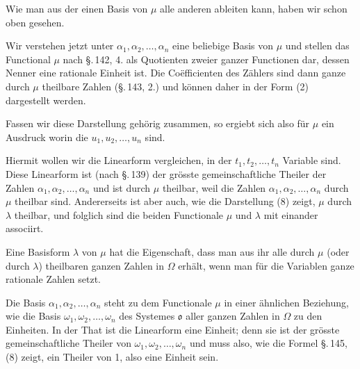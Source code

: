 
Wie man aus der einen Basis von $\mu$ alle anderen ableiten kann, haben
wir schon oben gesehen.

Wir verstehen jetzt unter $\alpha_1, \alpha_2, \ldots, \alpha_n$ eine
beliebige Basis von $\mu$ und stellen das Functional $\mu$ nach
\S.\,142, 4. als Quotienten zweier ganzer Functionen dar, dessen Nenner
eine rationale Einheit ist. Die Co\"efficienten des Zählers sind dann
ganze durch $\mu$ theilbare Zahlen (\S.\,143, 2.) und können daher in
der Form (2) dargestellt werden.

Fassen wir diese Darstellung gehörig zusammen, so ergiebt sich also für
$\mu$ ein Ausdruck
worin die $u_1, u_2, \ldots, u_n$ 
sind.

Hiermit wollen wir die Linearform
vergleichen, in der $t_1, t_2, \ldots, t_n$ Variable sind. Diese
Linearform ist (nach \S.\,139) der grösste gemeinschaftliche Theiler der
Zahlen $\alpha_1, \alpha_2, \ldots, \alpha_n$ und ist durch $\mu$
theilbar, weil die Zahlen $\alpha_1, \alpha_2, \ldots, \alpha_n$ durch
$\mu$ theilbar sind. Andererseits ist aber auch, wie die Darstellung (8)
zeigt, $\mu$ durch $\lambda$ theilbar, und folglich sind die beiden
Functionale $\mu$ und $\lambda$ mit einander associirt.


Eine Basisform $\lambda$ von $\mu$ hat die Eigenschaft, dass
man aus ihr alle durch $\mu$ (oder durch $\lambda$) theilbaren ganzen
Zahlen in $\Omega$ erhält, wenn man für die Variablen ganze rationale
Zahlen setzt.

Die Basis $\alpha_1, \alpha_2, \ldots, \alpha_n$ steht zu dem
Functionale $\mu$ in einer ähnlichen Beziehung, wie die Basis $\omega_1,
\omega_2, \ldots, \omega_n$ des Systemes $\mathfrak{o}$ aller ganzen Zahlen in
$\Omega$ zu den Einheiten. In der That ist die Linearform
eine Einheit; denn sie ist der grösste gemeinschaftliche Theiler von
$\omega_1, \omega_2, \ldots, \omega_n$ und muss also, wie die Formel
\S.\,145, (8) zeigt, ein Theiler von 1, also eine Einheit sein.

